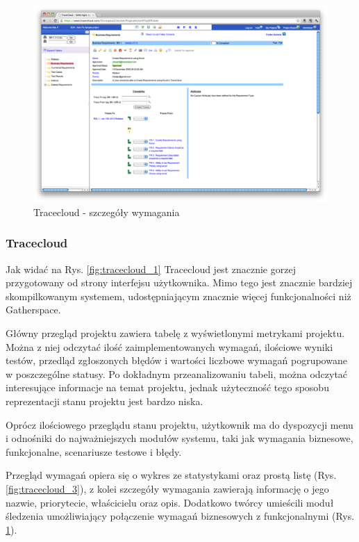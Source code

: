         \begin{figure}[t]
          \centering
          \includegraphics[width=1.0\textwidth]{img/tracecloud_4.pdf}
          \caption{Tracecloud - szczegóły wymagania}
          \label{fig:tracecloud_4}
        \end{figure}

      \subsubsection{Tracecloud}
        
        Jak widać na Rys. \ref{fig:tracecloud_1} Tracecloud jest znacznie gorzej przygotowany od strony interfejsu użytkownika. Mimo tego jest znacznie bardziej skompilkowanym systemem, udostępniającym znacznie więcej funkcjonalności niż Gatherspace.

        Główny przegląd projektu zawiera tabelę z wyświetlonymi metrykami projektu. Można z niej odczytać ilość zaimplementowanych wymagań, ilościowe wyniki testów, przedląd zgłoszonych błędów i wartości liczbowe wymagań pogrupowane w poszczególne statusy. Po dokładnym przeanalizowaniu tabeli, można odczytać interesujące informacje na temat projektu, jednak użyteczność tego sposobu reprezentacji stanu projektu jest bardzo niska. 

        Oprócz ilościowego przeglądu stanu projektu, użytkownik ma do dyspozycji menu i odnośniki do najważniejszych modułów systemu, taki jak wymagania biznesowe, funkcjonalne, scenariusze testowe i błędy.

        Przegląd wymagań opiera się o wykres ze statystykami oraz prostą listę (Rys. \ref{fig:tracecloud_3}), z kolei szczegóły wymagania zawierają informację o jego nazwie, priorytecie, właścicielu oraz opis. Dodatkowo twórcy umieścili moduł śledzenia umożliwiający połączenie wymagań biznesowych z funkcjonalnymi (Rys. \ref{fig:tracecloud_4}).
    
